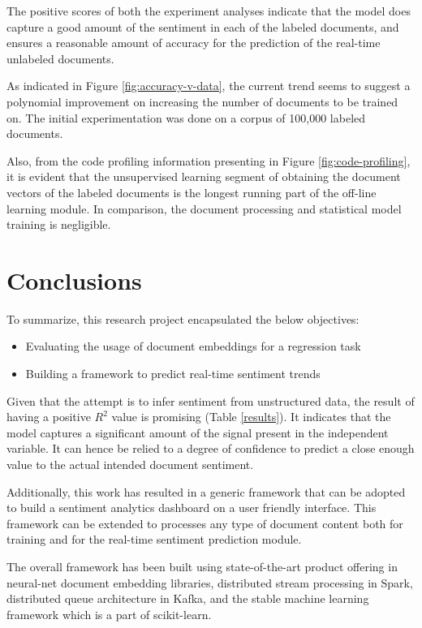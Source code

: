\documentclass[conference]{IEEEtran}
\begin{document}
        The positive scores of both the experiment analyses indicate that the model does capture a good amount of the sentiment in each of the labeled documents, and ensures a reasonable amount of accuracy for the prediction of the real-time unlabeled documents.

        As indicated in Figure \ref{fig:accuracy-v-data}, the current trend seems to suggest a polynomial improvement on increasing the number of documents to be trained on. 
        The initial experimentation was done on a corpus of 100,000 labeled documents. 

        Also, from the code profiling information presenting in Figure \ref{fig:code-profiling}, it is evident that the unsupervised learning segment of obtaining the document vectors of the labeled documents is the longest running part of the off-line learning module. In comparison, the document processing and statistical model training is negligible.

\vspace{5mm}

\section{Conclusions}
    To summarize, this research project encapsulated the below objectives:
    \begin{itemize}
        \item Evaluating the usage of document embeddings for a regression task
        \item Building a framework to predict real-time sentiment trends
    \end{itemize}

    Given that the attempt is to infer sentiment from unstructured data, the result of having a positive $R^2$ value is promising (Table \ref{results}).
    It indicates that the model captures a significant amount of the signal present in the independent variable.
    It can hence be relied to a degree of confidence to predict a close enough value to the actual intended document sentiment.

    Additionally, this work has resulted in a generic framework that can be adopted to build a sentiment analytics dashboard on a user friendly interface. 
    This framework can be extended to processes any type of document content both for training and for the real-time sentiment prediction module.

    The overall framework has been built using state-of-the-art product offering in neural-net document embedding libraries, distributed stream processing in Spark, distributed queue architecture in Kafka, and the stable machine learning framework which is a part of scikit-learn. 
\end{document}

